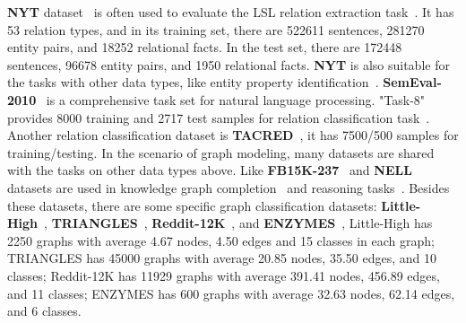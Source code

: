 \textbf{NYT} dataset~ is often used to evaluate the LSL relation extraction task~. It has 53 relation types, and in its training set, there are 522611 sentences, 281270 entity pairs, and 18252 relational facts. In the test set, there are 172448 sentences, 96678 entity pairs, and 1950 relational facts. \textbf{NYT} is also suitable for the tasks with other data types, like entity property identification~.
\textbf{SemEval-2010}~ is a comprehensive task set for natural language processing. "Task-8" provides 8000 training and 2717 test samples for relation classification task~. Another relation classification dataset is \textbf{TACRED}~, it has 7500/500 samples for training/testing.
In the scenario of graph modeling, many datasets are shared with the tasks on other data types above. Like \textbf{FB15K-237}~ and \textbf{NELL}~ datasets are used in knowledge graph completion~ and reasoning tasks~. Besides these datasets, there are some specific graph classification datasets: \textbf{Little-High}~, \textbf{TRIANGLES}~, \textbf{Reddit-12K}~, and \textbf{ENZYMES}~, Little-High has 2250 graphs with average 4.67 nodes, 4.50 edges and 15 classes in each graph; TRIANGLES has 45000 graphs with average 20.85 nodes, 35.50 edges, and 10 classes; Reddit-12K has 11929 graphs with average 391.41 nodes, 456.89 edges, and 11 classes; ENZYMES has 600 graphs with average 32.63 nodes, 62.14 edges, and 6 classes.
